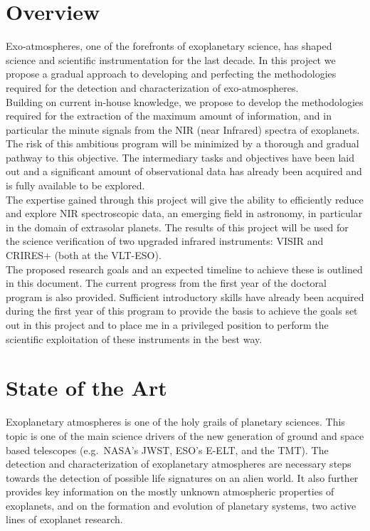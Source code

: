 \documentclass[pdftex,12pt,a4paper]{article}
\begin{document}


\tableofcontents

\newpage
\section{Overview}
Exo-atmospheres, one of the forefronts of exoplanetary science, has shaped science and scientific instrumentation for the last decade. In this project we propose a gradual approach to developing and perfecting the methodologies required for the detection and characterization of exo-atmospheres.\\

Building on current in-house knowledge, we propose to develop the methodologies required for the extraction of the maximum amount of information, and in particular the minute signals from the NIR (near Infrared) spectra of exoplanets. The risk of this ambitious program will be minimized by a thorough and gradual pathway to this objective. The intermediary tasks and objectives have been laid out and a significant amount of observational data has already been acquired and is fully available to be explored.\\

The expertise gained through this project will give the ability to efficiently reduce and explore NIR spectroscopic data, an emerging field in astronomy, in particular in the domain of extrasolar planets. The results of this project will be used for the science verification of two upgraded infrared instruments: VISIR and CRIRES+ (both at the VLT-ESO).\\

The proposed research goals and an expected timeline to achieve these is outlined in this document. The current progress from the first year of the doctoral program is also provided. Sufficient introductory skills have already been acquired during the first year of this program to provide the basis to achieve the goals set out in this project and to place me in a privileged position to perform the scientific exploitation of these instruments in the best way. \\

\newpage
\section{State of the Art}

Exoplanetary atmospheres is one of the holy grails of planetary sciences. This topic is one of the main science drivers of the new generation of ground and space based telescopes (e.g.\ NASA's JWST, ESO's E-ELT, and the TMT). The detection and characterization of exoplanetary atmospheres are necessary steps towards the detection of possible life signatures on an alien world. It also further provides key information on the mostly unknown atmospheric properties of exoplanets, and on the formation and evolution of planetary systems, two active lines of exoplanet research.\\
\end{document}
